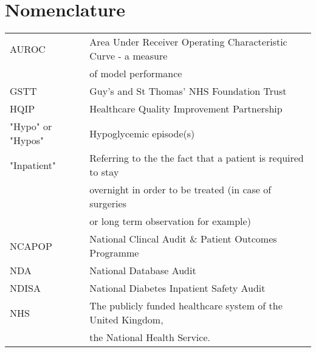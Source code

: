 \section*{Nomenclature}

\begin{flushleft}
\begin{minipage}{1\textwidth}
    	\centering
        \def\arraystretch{1.25}%
    	\begin{tabular}{ll}

			AUROC & Area Under Receiver Operating Characteristic Curve - a measure \\
			& of model performance \\
			GSTT  & Guy's and St Thomas' NHS Foundation Trust \\
			HQIP & Healthcare Quality Improvement Partnership \\
			"Hypo" or "Hypos" & Hypoglycemic episode(s) \\

			"Inpatient" & Referring to the the fact that a patient is required to stay \\ 
			& overnight in order to be treated (in case of surgeries \\  
			& or long term observation for example) \\

			NCAPOP & National Clincal Audit \& Patient Outcomes Programme \\
			NDA   & National Database Audit  \\
    		NDISA & National Diabetes Inpatient Safety Audit \\  
    		NHS & The publicly funded healthcare system of the United Kingdom, \\ 
            & the National Health Service. \\
			
      
                
    	\end{tabular}
\end{minipage}

\end{flushleft}

